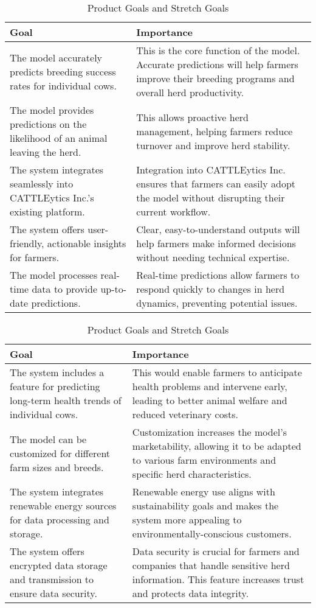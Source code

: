 \documentclass{article}
\begin{document}
\begin{table}[!htbp]
\centering
\caption{Product Goals and Stretch Goals}

\begin{tabularx}{\textwidth}{|X|X|}
\hline
\textbf{Goal} & \textbf{Importance} \\ \hline
The model accurately predicts breeding success rates for individual cows. & This is the core function of the model. Accurate predictions will help farmers improve their breeding programs and overall herd productivity. \\ \hline
The model provides predictions on the likelihood of an animal leaving the herd. & This allows proactive herd management, helping farmers reduce turnover and improve herd stability. \\ \hline
The system integrates seamlessly into CATTLEytics Inc.'s existing platform. & Integration into CATTLEytics Inc. ensures that farmers can easily adopt the model without disrupting their current workflow. \\ \hline
The system offers user-friendly, actionable insights for farmers. & Clear, easy-to-understand outputs will help farmers make informed decisions without needing technical expertise. \\ \hline
The model processes real-time data to provide up-to-date predictions. & Real-time predictions allow farmers to respond quickly to changes in herd dynamics, preventing potential issues. \\ \hline
\end{tabularx}

\vspace{5mm} %

\begin{tabularx}{\textwidth}{|X|X|}
\hline
\textbf{Goal} & \textbf{Importance} \\ \hline
The system includes a feature for predicting long-term health trends of individual cows. & This would enable farmers to anticipate health problems and intervene early, leading to better animal welfare and reduced veterinary costs. \\ \hline
The model can be customized for different farm sizes and breeds. & Customization increases the model's marketability, allowing it to be adapted to various farm environments and specific herd characteristics. \\ \hline
The system integrates renewable energy sources for data processing and storage. & Renewable energy use aligns with sustainability goals and makes the system more appealing to environmentally-conscious customers. \\ \hline
The system offers encrypted data storage and transmission to ensure data security. & Data security is crucial for farmers and companies that handle sensitive herd information. This feature increases trust and protects data integrity. \\ \hline
\end{tabularx}

\end{table}
\end{document}
